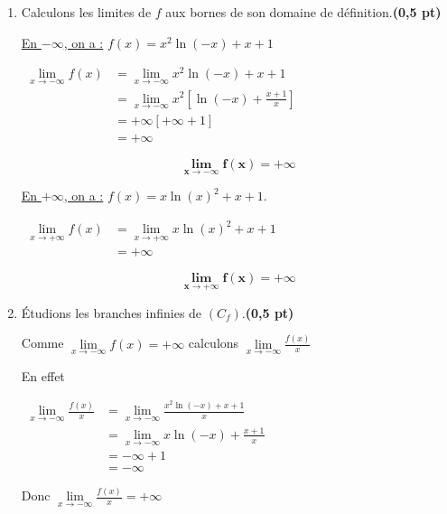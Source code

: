 \documentclass[12pt,a4paper]{article}
\begin{document}
\begin{enumerate}
\item Calculons les limites de \( f \) aux bornes de son domaine de définition.\hfill \textbf{(0,5 pt)}

\underline{En \( -\infty \), on a :} \( f(x) = x^2 \ln(-x) + x + 1 \)

\(
\begin{aligned}
    \lim\limits_{x\to -\infty} f(x) &= \lim\limits_{x\to -\infty} x^2 \ln(-x) + x + 1\\
    &= \lim\limits_{x\to -\infty} x^{2} \left[\ln(-x) + \frac{x + 1}{x}\right]\\
    &= +\infty \left[+\infty+1 \right]\\
    &=+\infty
\end{aligned}
\)

\begin{resultbox}
    \[
        \mathbf{\lim\limits_{x\to -\infty} f(x) = +\infty }
    \]
\end{resultbox} 

\underline{En \( +\infty \), on a :} \( f(x) = x \ln(x)^2 + x + 1. \)

\(
\begin{aligned}
    \lim\limits_{x\to +\infty} f(x) &= \lim\limits_{x\to +\infty}  x \ln(x)^2 + x + 1\\
    &=+\infty
\end{aligned}
\)

\begin{resultbox}
    \[
        \mathbf{\lim\limits_{x\to +\infty} f(x) = +\infty }
    \]
\end{resultbox} 

\item Étudions les branches infinies de \( (C_f) \).\hfill \textbf{(0,5 pt)}

Comme \( \lim\limits_{x\to -\infty} f(x) = +\infty  \) calculons \( \lim\limits_{x\to -\infty} \frac{f(x)}{x}   \)

En effet 

\( 
\begin{aligned}
    \lim\limits_{x\to -\infty} \frac{f(x)}{x} &= \lim\limits_{x\to -\infty} \frac{x^2 \ln(-x) + x + 1}{x}\\
    &=\lim\limits_{x\to -\infty} x\ln(-x) + \frac{x + 1}{x}\\
    &=-\infty+1\\
    &=-\infty
\end{aligned} 
\)

Donc \( \lim\limits_{x\to -\infty} \frac{f(x)}{x} =+\infty   \)


\end{enumerate}
\end{document}
